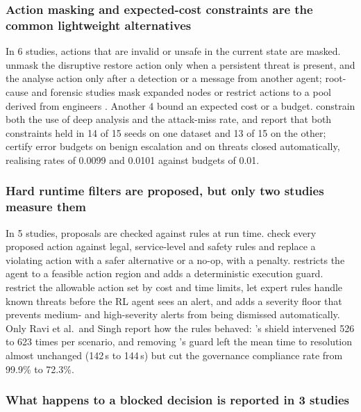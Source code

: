 \documentclass[pdflatex,sn-basic]{sn-jnl}
\begin{document}
\subsubsection{Action masking and expected-cost constraints are the common lightweight alternatives}

In 6 studies, actions that are invalid or unsafe in the current state are masked. \citet{contractor2025} unmask the disruptive restore action only when a persistent threat is present, and the analyse action only after a detection or a message from another agent; root-cause and forensic studies mask expanded nodes or restrict actions to a pool derived from engineers \citep{wang2024mrca,rojasrodriguez2026,ding2023,ghanem2026,wu2026}. Another 4 bound an expected cost or a budget. \citet{kovtun2026} constrain both the use of deep analysis and the attack-miss rate, and report that both constraints held in 14 of 15 seeds on one dataset and 13 of 15 on the other; \citet{sahin2026} certify error budgets on benign escalation and on threats closed automatically, realising rates of 0.0099 and 0.0101 against budgets of 0.01.

\subsubsection{Hard runtime filters are proposed, but only two studies measure them}

In 5 studies, proposals are checked against rules at run time. \citet{ravi2025} check every proposed action against legal, service-level and safety rules and replace a violating action with a safer alternative or a no-op, with a penalty. \citet{singh2026} restricts the agent to a feasible action region and adds a deterministic execution guard. \citet{koupaei2026} restrict the allowable action set by cost and time limits, \citet{elicha2026} let expert rules handle known threats before the RL agent sees an alert, and \citet{okafor2026} adds a severity floor that prevents medium- and high-severity alerts from being dismissed automatically. Only Ravi et al.\ and Singh report how the rules behaved: \citeauthor{ravi2025}'s \citeyearpar{ravi2025} shield intervened 526 to 623 times per scenario, and removing \citeauthor{singh2026}'s \citeyearpar{singh2026} guard left the mean time to resolution almost unchanged (142\,s to 144\,s) but cut the governance compliance rate from 99.9\% to 72.3\%.

\subsubsection{What happens to a blocked decision is reported in 3 studies}
\end{document}

